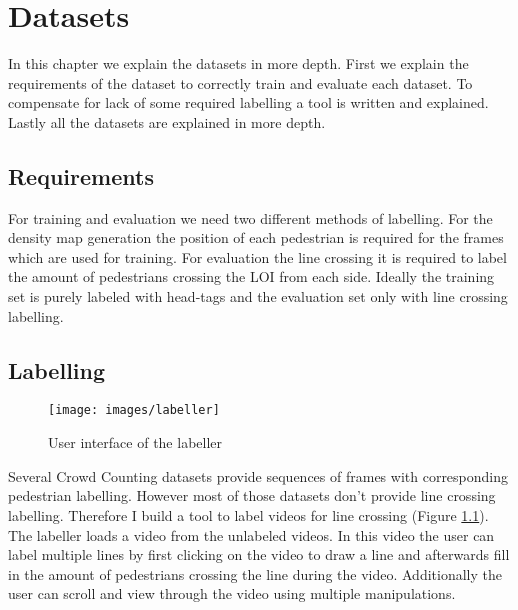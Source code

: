 \chapter{Datasets}
In this chapter we explain the datasets in more depth. First we explain the requirements of the dataset to correctly train and evaluate each dataset. To compensate for lack of some required labelling a tool is written and explained. Lastly all the datasets are explained in more depth.

\section{Requirements}
For training and evaluation we need two different methods of labelling. For the density map generation the position of each pedestrian is required for the frames which are used for training. For evaluation the line crossing it is required to label the amount of pedestrians crossing the LOI from each side. Ideally the training set is purely labeled with head-tags and the evaluation set only with line crossing labelling.

\section{Labelling}
\begin{figure}[!htb]
\centering
\texttt{[image: images/labeller]}
\caption{User interface of the labeller}
\label{fig:labeller}
\end{figure}

Several Crowd Counting datasets provide sequences of frames with corresponding pedestrian labelling. However most of those datasets don't provide line crossing labelling. Therefore I build a tool to label videos for line crossing (Figure \ref{fig:labeller}).
The labeller loads a video from the unlabeled videos. In this video the user can label multiple lines by first clicking on the video to draw a line and afterwards fill in the amount of pedestrians crossing the line during the video. Additionally the user can scroll and view through the video using multiple manipulations.


